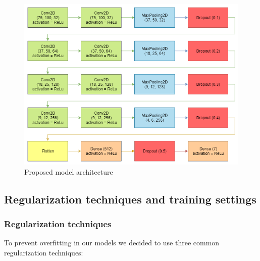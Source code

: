 		\begin{figure}[H]
			\centering
			\includegraphics[width=15cm]{images/proposed_model.png}
			\caption{Proposed model architecture}
			\label{fig:proposed_model}
		\end{figure}
	
	\subsection{Regularization techniques and training settings}
	
		\subsubsection{Regularization techniques} \label{regularization_techniques}
		
			To prevent overfitting in our models we decided to use three common regularization techniques:
			
